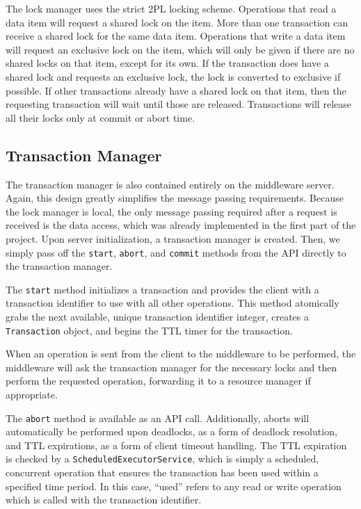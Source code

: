 \documentclass[11pt]{article}
\begin{document}
The lock manager uses the strict 2PL locking scheme. Operations that read a data item will request a shared lock on the item. More than one transaction can receive a shared lock for the same data item. Operations that write a data item will request an exclusive lock on the item, which will only be given if there are no shared locks on that item, except for its own. If the transaction does have a shared lock and requests an exclusive lock, the lock is converted to exclusive if possible. If other transactions already have a shared lock on that item, then the requesting transaction will wait until those are released. Transactions will release all their locks only at commit or abort time. \par

\subsection*{Transaction Manager}

The transaction manager is also contained entirely on the middleware server. Again, this design greatly simplifies the message passing requirements. Because the lock manager is local, the only message passing required after a request is received is the data access, which was already implemented in the first part of the project. Upon server initialization, a transaction manager is created. Then, we simply pass off the \texttt{start}, \texttt{abort}, and \texttt{commit} methods from the API directly to the transaction manager. \par

The \texttt{start} method initializes a transaction and provides the client with a transaction identifier to use with all other operations. This method atomically grabs the next available, unique transaction identifier integer, creates a \texttt{Transaction} object, and begins the TTL timer for the transaction. \par

When an operation is sent from the client to the middleware to be performed, the middleware will ask the transaction manager for the necessary locks and then perform the requested operation, forwarding it to a resource manager if appropriate.

The \texttt{abort} method is available as an API call. Additionally, aborts will automatically be performed upon deadlocks, as a form of deadlock resolution, and TTL expirations, as a form of client timeout handling. The TTL expiration is checked by a \texttt{ScheduledExecutorService}, which is simply a scheduled, concurrent operation that ensures the transaction has been used within a specified time period. In this case, ``used'' refers to any read or write operation which is called with the transaction identifier.  \par
\end{document}
